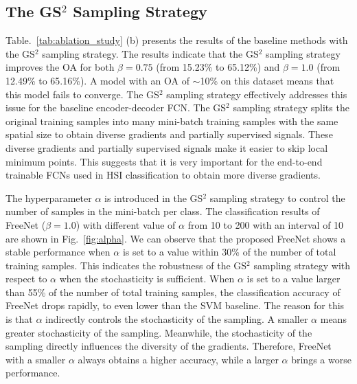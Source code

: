 \documentclass[journal]{IEEEtran}
\begin{document}
\subsection{\textbf{The GS$^2$ Sampling Strategy}}
\label{sec:gs2}
Table.~\ref{tab:ablation_study} (b) presents the results of the baseline methods with the GS$^2$ sampling strategy.
The results indicate that the GS$^2$ sampling strategy improves the OA for both $\beta=0.75$ (from 15.23\% to 65.12\%) and $\beta=1.0$ (from 12.49\% to 65.16\%).
A model with an OA of $\sim$10\% on this dataset means that this model fails to converge.
The GS$^2$ sampling strategy effectively addresses this issue for the baseline encoder-decoder FCN.
The GS$^2$ sampling strategy splits the original training samples into many mini-batch training samples with the same spatial size to obtain diverse gradients and partially supervised signals.
These diverse gradients and partially supervised signals make it easier to skip local minimum points.
This suggests that it is very important for the end-to-end trainable FCNs used in HSI classification to obtain more diverse gradients.




The hyperparameter $\alpha$ is introduced in the GS$^2$ sampling strategy to control the number of samples in the mini-batch per class.
The classification results of FreeNet ($\beta=1.0$) with different value of $\alpha$ from 10 to 200 with an interval of 10 are shown in Fig.~\ref{fig:alpha}.
We can observe that the proposed FreeNet shows a stable performance when $\alpha$ is set to a value within 30\% of the number of total training samples.
This indicates the robustness of the GS$^2$ sampling strategy with respect to $\alpha$ when the stochasticity is sufficient.
When $\alpha$ is set to a value larger than 55\% of the number of total training samples, the classification accuracy of FreeNet drops rapidly, to even lower than the SVM baseline.
The reason for this is that $\alpha$ indirectly controls the stochasticity of the sampling.
A smaller $\alpha$ means greater stochasticity of the sampling.
Meanwhile, the stochasticity of the sampling directly influences the diversity of the gradients.
Therefore, FreeNet with a smaller $\alpha$ always obtains a higher accuracy, while a larger $\alpha$ brings a worse performance.
\end{document}
